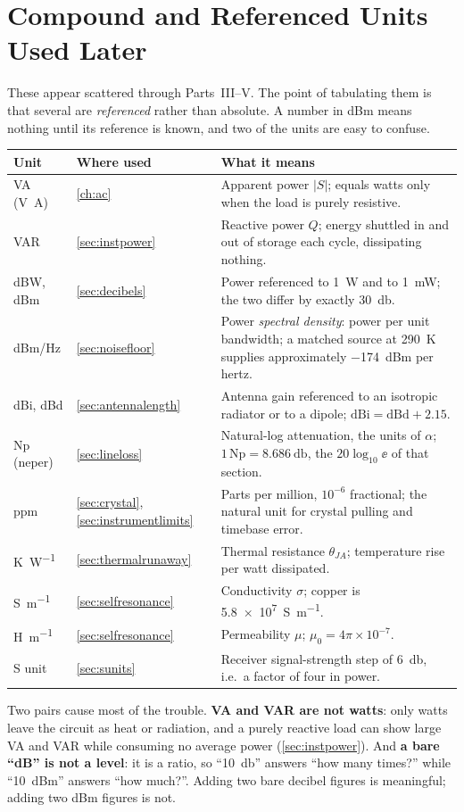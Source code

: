 \section{Compound and Referenced Units Used Later}
These appear scattered through Parts~III--V. The point of tabulating them is that
several are \emph{referenced} rather than absolute. A number in dBm means nothing
until its reference is known, and two of the units are easy to confuse.

\begin{tabularx}{\textwidth}{@{}L{0.20\textwidth}L{0.20\textwidth}Y@{}}
\toprule
Unit & Where used & What it means \\
\midrule
VA (\si{\volt\ampere}) & \cref{ch:ac} & Apparent power \(|S|\); equals watts only when the load is purely resistive. \\
VAR & \cref{sec:instpower} & Reactive power \(Q\); energy shuttled in and out of storage each cycle, dissipating nothing. \\
dBW, dBm & \cref{sec:decibels} & Power referenced to \SI{1}{\watt} and to \SI{1}{\milli\watt}; the two differ by exactly \SI{30}{\decibel}. \\
dBm/Hz & \cref{sec:noisefloor} & Power \emph{spectral density}: power per unit bandwidth; a matched source at \SI{290}{\kelvin} supplies approximately \SI{-174}{dBm} per hertz. \\
dBi, dBd & \cref{sec:antennalength} & Antenna gain referenced to an isotropic radiator or to a dipole; \(\mathrm{dBi}=\mathrm{dBd}+2.15\). \\
Np (neper) & \cref{sec:lineloss} & Natural-log attenuation, the units of \(\alpha\); \(1\,\mathrm{Np}=\SI{8.686}{\decibel}\), the \(20\log_{10}\ee\) of that section. \\
ppm & \cref{sec:crystal}, \cref{sec:instrumentlimits} & Parts per million, \(10^{-6}\) fractional; the natural unit for crystal pulling and timebase error. \\
\si{\kelvin\per\watt} & \cref{sec:thermalrunaway} & Thermal resistance \(\theta_{JA}\); temperature rise per watt dissipated. \\
\si{\siemens\per\meter} & \cref{sec:selfresonance} & Conductivity \(\sigma\); copper is \SI{5.8e7}{\siemens\per\meter}. \\
\si{\henry\per\meter} & \cref{sec:selfresonance} & Permeability \(\mu\); \(\mu_0=4\pi\times10^{-7}\). \\
S unit & \cref{sec:sunits} & Receiver signal-strength step of \SI{6}{\decibel}, i.e.\ a factor of four in power. \\
\bottomrule
\end{tabularx}

\begin{mistakebox}
Two pairs cause most of the trouble. \textbf{VA and VAR are not watts}: only watts
leave the circuit as heat or radiation, and a purely reactive load can show large VA
and VAR while consuming no average power (\cref{sec:instpower}). And \textbf{a bare
``dB'' is not a level}: it is a ratio, so ``\SI{10}{\decibel}'' answers ``how many
times?'' while ``\SI{10}{dBm}'' answers ``how much?''. Adding two bare decibel figures
is meaningful; adding two dBm figures is not.
\end{mistakebox}
